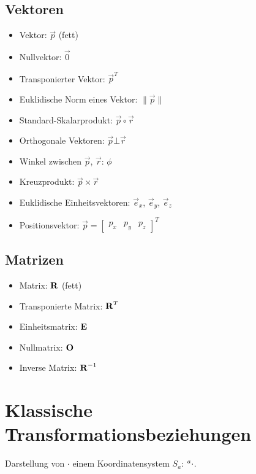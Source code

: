 		\subsection{Vektoren}
			\begin{itemize}
				\item Vektor:                        \tabto{5.5cm} \( \vec{p} \) (fett)
				\item Nullvektor:                    \tabto{5.5cm} \( \vec{0} \)
				\item Transponierter Vektor:         \tabto{5.5cm} \( \vec{p}^T  \)
				\item Euklidische Norm eines Vektor: \tabto{5.5cm} \( \lVert \vec{p} \rVert \)
				\item Standard-Skalarprodukt:        \tabto{5.5cm} \( \vec{p} \circ \vec{r} \)
				\item Orthogonale Vektoren:          \tabto{5.5cm} \( \vec{p} \bot \vec{r} \)
				\item Winkel zwischen                \tabto{5.5cm} \(\vec{p}\), \(\vec{r}\): \( \phi \)
				\item Kreuzprodukt:                  \tabto{5.5cm} \( \vec{p} \times \vec{r} \)
				\item Euklidische Einheitsvektoren:  \tabto{5.5cm} \( \vec{e}_x \), \( \vec{e}_y \), \( \vec{e}_z \)
				\item Positionsvektor:               \tabto{5.5cm} \( \vec{p} = \begin{bmatrix} p_x & p_y & p_z \end{bmatrix}^T \)
			\end{itemize}

		\subsection{Matrizen}
			\begin{itemize}
				\item Matrix:               \tabto{4cm} \( \boldsymbol{\mathrm{R}} \) (fett)
				\item Transponierte Matrix: \tabto{4cm} \( \boldsymbol{\mathrm{R}}^T \)
				\item Einheitsmatrix:       \tabto{4cm} \( \boldsymbol{\mathrm{E}} \)
				\item Nullmatrix:           \tabto{4cm} \( \boldsymbol{\mathrm{O}} \)
				\item Inverse Matrix:       \tabto{4cm} \( \boldsymbol{\mathrm{R}}^{-1} \)
			\end{itemize}

	\section{Klassische Transformationsbeziehungen}
		Darstellung von \( \cdot \) \bzgl einem Koordinatensystem \( S_a \): \( \prescript{a}{}{\cdot} \).
		
